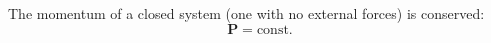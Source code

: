 The momentum of a closed system (one with no external forces) is conserved:
$$\mathbf{P} = \text{const}.$$
